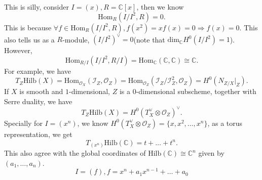 \documentclass[../main.tex]{subfiles}
\begin{document}
\begin{example}[$H^{0}(N_{Z/X})\neq H^{0}(N_{Z/X}|_{Z})$]
This is silly, consider $I=(x), R=\mathbb{C}[x]$, then we know 
$$\mathrm{Hom}_{R}(I/I^{2}, R)=0.$$
This is because $\forall f\in \mathrm{Hom}_{R}(I/I^{2}, R), f(x^{2})=xf(x)=0\Rightarrow f(x)=0$. This also tells us as a $R$-module, $(I/I^{2})^{\vee}=0$(note that $\mathrm{dim}_{\mathbb{C}}H^{0}(I/I^{2})=1$). However, $$\mathrm{Hom}_{R/I}(I/I^{2}, R/I)=\mathrm{Hom}_{\mathbb{C}}(\mathbb{C}, \mathbb{C})\cong \mathbb{C}.$$
For example, we have 
$$T_{Z}\mathrm{Hilb}(X)=\mathrm{Hom}_{\mathcal{O}_{X}}(\mathcal{I}_{Z}, \mathcal{O}_{Z})=\mathrm{Hom}_{\mathcal{O}_{Z}}(\mathcal{I}_{Z}/\mathcal{I}_{Z}^{2}, \mathcal{O}_{Z})=H^{0}(N_{Z/X}|_{Z}).$$
If $X$ is smooth and $1$-dimensional, $Z$ is a $0$-dimensional subscheme, together with Serre duality, we have 
$$T_{Z}\mathrm{Hilb}(X)=H^{0}(T^{\vee}_{X}\otimes \mathcal{O}_{Z})^{\vee}.$$
Specially for $I=(x^{n})$, we know $H^{0}(T^{\vee}_{X}\otimes \mathcal{O}_{Z})=\{x, x^{2}, \dots, x^{n}\}$, as a torus representation, we get 
$$T_{(x^{n})}\mathrm{Hilb}(\mathbb{C})=t+\dots + t^{n}.$$
This also agree with the global coordinates of $\mathrm{Hilb}(\mathbb{C})\cong \mathbb{C}^{n}$ given by $(a_{1}, \dots, a_{n})$.
$$I=(f), f=x^{n}+a_{1}x^{n-1}+\dots+ a_{0}$$
\end{example}
\end{document}
